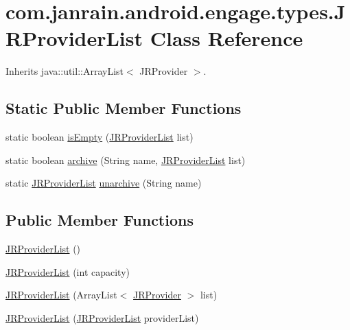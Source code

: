 \hypertarget{classcom_1_1janrain_1_1android_1_1engage_1_1types_1_1_j_r_provider_list}{
\section{com.janrain.android.engage.types.JRProviderList Class Reference}
\label{classcom_1_1janrain_1_1android_1_1engage_1_1types_1_1_j_r_provider_list}
}


Inherits java::util::ArrayList$<$ JRProvider $>$.

\subsection*{Static Public Member Functions}
\begin{DoxyCompactItemize}
\item 
static boolean \hyperlink{classcom_1_1janrain_1_1android_1_1engage_1_1types_1_1_j_r_provider_list_acba84d574a583106a4f8c8320c689259}{isEmpty} (\hyperlink{classcom_1_1janrain_1_1android_1_1engage_1_1types_1_1_j_r_provider_list}{JRProviderList} list)
\item 
static boolean \hyperlink{classcom_1_1janrain_1_1android_1_1engage_1_1types_1_1_j_r_provider_list_a2a4780a35e42daf8b687be39a8c3f3fd}{archive} (String name, \hyperlink{classcom_1_1janrain_1_1android_1_1engage_1_1types_1_1_j_r_provider_list}{JRProviderList} list)
\item 
static \hyperlink{classcom_1_1janrain_1_1android_1_1engage_1_1types_1_1_j_r_provider_list}{JRProviderList} \hyperlink{classcom_1_1janrain_1_1android_1_1engage_1_1types_1_1_j_r_provider_list_a900579d9429568ec4596b154cf80c533}{unarchive} (String name)
\end{DoxyCompactItemize}
\subsection*{Public Member Functions}
\begin{DoxyCompactItemize}
\item 
\hyperlink{classcom_1_1janrain_1_1android_1_1engage_1_1types_1_1_j_r_provider_list_a3533aa03b9992f8cbca48c3f74d999f7}{JRProviderList} ()
\item 
\hyperlink{classcom_1_1janrain_1_1android_1_1engage_1_1types_1_1_j_r_provider_list_aafa3df47aaf5955ba8a871b58636c71e}{JRProviderList} (int capacity)
\item 
\hyperlink{classcom_1_1janrain_1_1android_1_1engage_1_1types_1_1_j_r_provider_list_a5424cb2aed9f0d6fdcd4b51650bd6846}{JRProviderList} (ArrayList$<$ \hyperlink{classcom_1_1janrain_1_1android_1_1engage_1_1session_1_1_j_r_provider}{JRProvider} $>$ list)
\item 
\hyperlink{classcom_1_1janrain_1_1android_1_1engage_1_1types_1_1_j_r_provider_list_a471146fd0d774ad8b2c27220280e69a1}{JRProviderList} (\hyperlink{classcom_1_1janrain_1_1android_1_1engage_1_1types_1_1_j_r_provider_list}{JRProviderList} providerList)
\end{DoxyCompactItemize}


